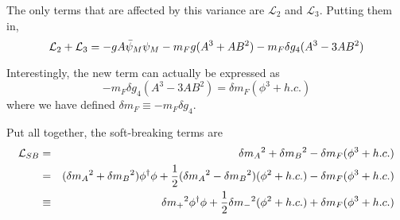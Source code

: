 The only terms that are affected by this variance are $\mathcal{L}_2$ and $\mathcal{L}_3$. Putting them in,
\begin{equation}
    \mathcal{L}_2 + \mathcal{L}_3 = -gA\Bar{\psi}_M \psi_M - m_F g (A^3 + AB^2) - m_F \delta g_4 (A^3 - 3AB^2)
\end{equation}

Interestingly, the new term can actually be expressed as
\begin{equation}
    -m_F \delta g_4 (A^3 - 3AB^2) = \delta m_F (\phi^3 + h.c.)
\end{equation}
where we have defined $\delta m_F \equiv -m_F \delta g_4$.

Put all together, the soft-breaking terms are 
\begin{eqnarray}
    \mathcal{L}_{SB} &=& \delta {m_A}^2 + \delta {m_B}^2 - \delta m_F (\phi^3 + h.c.) \nonumber \\
    &=& (\delta {m_A}^2 + \delta {m_B}^2 ) \phi^\dagger \phi + \frac{1}{2}(\delta {m_A}^2 - \delta {m_B}^2 ) (\phi^2 + h.c.) - \delta m_F (\phi^3 + h.c.) \nonumber \\
    &\equiv& \delta {m_+}^2 \phi^\dagger \phi + \frac{1}{2} \delta {m_-}^2 (\phi^2 + h.c.) + \delta m_F (\phi^3 + h.c.)
\end{eqnarray}

